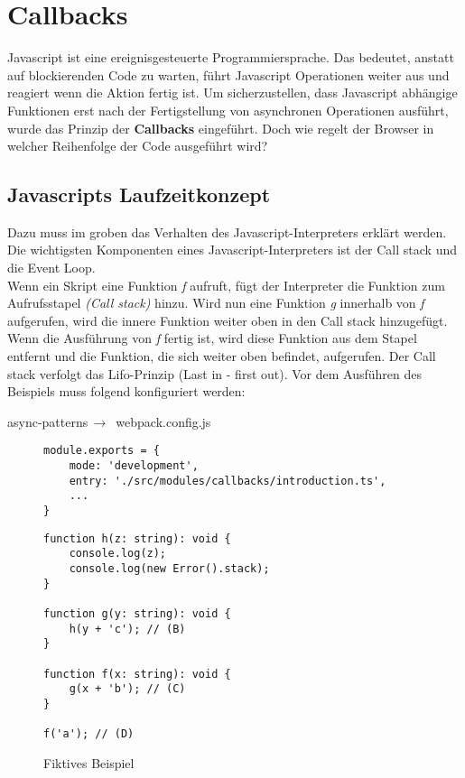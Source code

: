 \section{Callbacks}
Javascript ist eine ereignisgesteuerte Programmiersprache. Das bedeutet, anstatt auf blockierenden Code zu warten, führt Javascript Operationen weiter aus und reagiert wenn die Aktion fertig ist. Um sicherzustellen, dass Javascript abhängige Funktionen erst nach der Fertigstellung von asynchronen Operationen ausführt, wurde das Prinzip der \textbf{Callbacks} eingeführt. Doch wie regelt der Browser in welcher Reihenfolge der Code ausgeführt wird?

\subsection{Javascripts Laufzeitkonzept}
Dazu muss im groben das Verhalten des Javascript-Interpreters erklärt werden. Die wichtigsten Komponenten eines Javascript-Interpreters ist der Call stack und die Event Loop.\\

\noindent
Wenn ein Skript eine Funktion \textit{f} aufruft, fügt der Interpreter die Funktion zum Aufrufsstapel \textit{(Call stack)} hinzu. Wird nun eine Funktion \textit{g} innerhalb von \textit{f} aufgerufen, wird die innere Funktion weiter oben in den Call stack hinzugefügt. Wenn die Ausführung von \textit{f} fertig ist, wird diese Funktion aus dem Stapel entfernt und die Funktion, die sich weiter oben befindet, aufgerufen. Der Call stack verfolgt das Lifo-Prinzip (Last in - first out)\cite{javascript-interpreter}. Vor dem Ausführen des Beispiels muss folgend konfiguriert werden:

\begin{center}
    async-patterns$\,\to\,$ webpack.config.js
\end{center}

\begin{figure}[H]
\begin{lstlisting}[basicstyle=\small]
module.exports = {
    mode: 'development',
    entry: './src/modules/callbacks/introduction.ts',
    ...
}
\end{lstlisting}
\end{figure}

\begin{figure}[H]
\begin{lstlisting}[basicstyle=\small]
function h(z: string): void {
    console.log(z);
    console.log(new Error().stack);
}

function g(y: string): void {
    h(y + 'c'); // (B)
}

function f(x: string): void {
    g(x + 'b'); // (C)
}

f('a'); // (D)
\end{lstlisting}
\caption{Fiktives Beispiel}
\end{figure}

